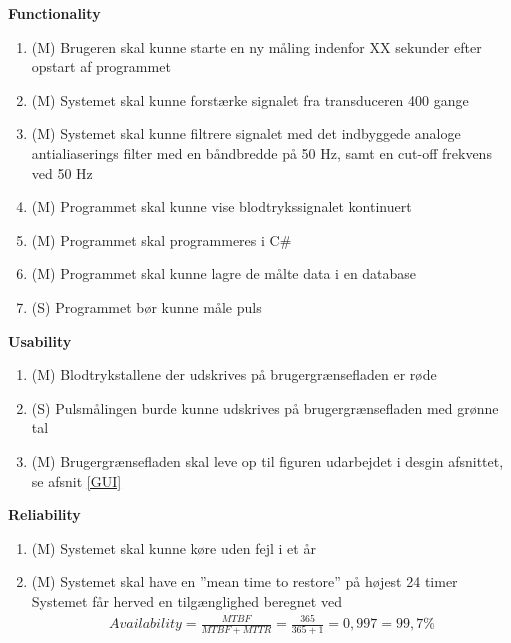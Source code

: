 \textbf{Functionality}\\
\begin{enumerate}
	\item (M) Brugeren skal kunne starte en ny måling indenfor XX sekunder efter opstart af programmet \\
	\item (M) Systemet skal kunne forstærke signalet fra transduceren 400 gange\\
	\item (M) Systemet skal kunne filtrere signalet med det indbyggede analoge antialiaserings filter med en båndbredde på 50 Hz, samt en cut-off frekvens ved 50 Hz \\
	\item (M) Programmet skal kunne vise blodtrykssignalet kontinuert\\
	\item (M) Programmet skal programmeres i C\#\\
	\item (M) Programmet skal kunne lagre de målte data i en database\\
	\item (S) Programmet bør kunne måle puls\\
\end{enumerate}

\textbf{Usability}\\
\begin{enumerate}
	\item (M) Blodtrykstallene der udskrives på brugergrænsefladen er røde\\
	\item (S) Pulsmålingen burde kunne udskrives på brugergrænsefladen med grønne tal\\
	\item (M) Brugergrænsefladen skal leve op til figuren udarbejdet i desgin afsnittet, se afsnit \ref{GUI} \\
\end{enumerate}

\textbf{Reliability}\\
\begin{enumerate}
	\item (M) Systemet skal kunne køre uden fejl i et år\\
	\item (M) Systemet skal have en ”mean time to restore” på højest 24 timer\\
	\subitem Systemet får herved en tilgænglighed beregnet ved \begin{align}
Availability = \frac{MTBF}{MTBF+MTTR} = \frac{365}{365+1} = 0,997 = 99,7 \%
\end{align}\\
\end{enumerate}

